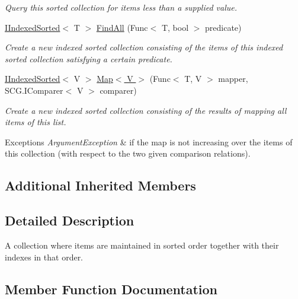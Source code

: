 \begin{DoxyCompactItemize}
\begin{DoxyCompactList}\small\item\em Query this sorted collection for items less than a supplied value. \end{DoxyCompactList}\item 
\hyperlink{interface_c5_1_1_i_indexed_sorted}{I\+Indexed\+Sorted}$<$ T $>$ \hyperlink{interface_c5_1_1_i_indexed_sorted_a0919e5cb5b659d0de7c206a3c3bc033d}{Find\+All} (Func$<$ T, bool $>$ predicate)
\begin{DoxyCompactList}\small\item\em Create a new indexed sorted collection consisting of the items of this indexed sorted collection satisfying a certain predicate. \end{DoxyCompactList}\item 
\hyperlink{interface_c5_1_1_i_indexed_sorted}{I\+Indexed\+Sorted}$<$ V $>$ \hyperlink{interface_c5_1_1_i_indexed_sorted_ab895a7e04cffcc97f6f0ef5e7c00b171}{Map$<$ V $>$} (Func$<$ T, V $>$ mapper, S\+C\+G.\+I\+Comparer$<$ V $>$ comparer)
\begin{DoxyCompactList}\small\item\em Create a new indexed sorted collection consisting of the results of mapping all items of this list. 
\begin{DoxyExceptions}{Exceptions}
{\em Argument\+Exception} & if the map is not increasing over the items of this collection (with respect to the two given comparison relations). \\
\hline
\end{DoxyExceptions}
\end{DoxyCompactList}\end{DoxyCompactItemize}
\subsection*{Additional Inherited Members}


\subsection{Detailed Description}
A collection where items are maintained in sorted order together with their indexes in that order. 



\subsection{Member Function Documentation}
\hypertarget{interface_c5_1_1_i_indexed_sorted_afec472803ce8298d60dfc5dfb2f8f925}{}
